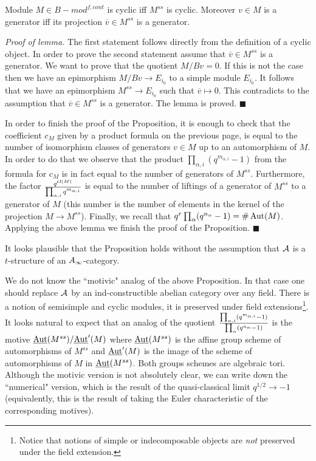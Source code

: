 \documentclass[12pt]{article}
\begin{document}
\begin{lmm} Module $M\in B-mod^{f,cont}$ is cyclic iff
$M^{ss}$ is cyclic.
Moreover $v\in M$ is a generator iff its projection $\overline{v}\in M^{ss}$ is a generator.


\end{lmm}
{\it Proof of lemma.} The first statement follows directly from the definition of a cyclic object. 
 In order to prove the second statement assume that $\overline{v}\in M^{ss}$ is a generator. We want to prove that the quotient $M/Bv=0$. If this is not the case then we have an epimorphism $M/Bv\to E_{i_0}$ to a simple module $E_{i_0}$. It follows that we have an epimorphism
$M^{ss}\to E_{i_0}$ such that $\overline{v}\mapsto 0$. This contradicts to the assumption that $\overline{v}\in M^{ss}$ is a generator. The lemma is proved. $\blacksquare$

In order to finish the proof of the Proposition, it is enough to check that the coefficient $c_M$ given by a product formula on the previous page, 
 is equal to the number of isomorphism classes of generators $v\in M$ up to an automorphism of $M$. In order to do that we observe that
the product $\prod_{\alpha,i}(q^{m_{\alpha,i}}-1)$ from the formula for $c_M$ is in fact equal to the number of generators of $M^{ss}$. Furthermore, the factor ${q^{\operatorname{cl}(M)}\over{\prod_{\alpha,i}q^{m_{\alpha,i}}}}$ is equal to the number of liftings of a generator of $M^{ss}$ to a generator of $M$ (this number is the number of elements in the kernel of the projection $M\to M^{ss}$). Finally, we recall that $q^r\prod_{\alpha}(q^{n_{\alpha}}-1)=\#\operatorname{Aut}(M)$. Applying the above lemma we finish the proof of the Proposition. $\blacksquare$

\begin{rmk} It looks plausible that the Proposition holds without the assumption that ${\cal A}$ is a $t$-structure of an $A_{\infty}$-category.

\end{rmk}


We do not know the ``motivic" analog of the above Proposition. In that case one should replace ${\cal A}$ by an ind-constructible 
abelian category over  any field. There is a notion of  semisimple and cyclic modules, it is preserved under field extensions\footnote{Notice that notions of simple or indecomposable objects are {\it not} preserved under the field extension.}.
It looks natural to expect that an analog of the quotient ${\prod_{\alpha,i}(q^{m_{\alpha,i}}-1)\over{\prod_{\alpha}(q^{n_{\alpha}}-1)}}$ is the motive
 $\underline{\operatorname{Aut}}(M^{ss})/\underline{\operatorname{Aut}}'(M)$ where $\underline{\operatorname{Aut}}(M^{ss})$ is the affine group scheme of automorphisms of $M^{ss}$
 and $\underline{\operatorname{Aut}}'(M)$ is the image of the scheme of automorphisms of $M$ in $\underline{\operatorname{Aut}}(M^{ss})$. Both groups schemes are algebraic tori.
 Although the motivic version is not absolutely clear, we can write down the ``numerical" version, which is the result of the quasi-classical limit $q^{1/2}\to -1$ (equivalently, this is the result of taking the Euler characteristic of the corresponding motives).
\end{document}
